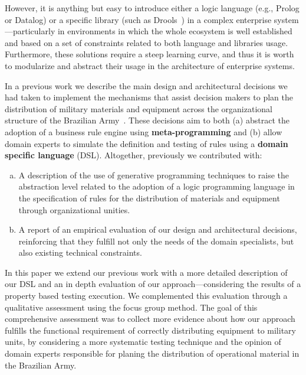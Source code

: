 \documentclass[AMA,STIX1COL,hidelinks]{WileyNJD-v2}
\begin{document}
However, it is anything but easy to introduce either a logic language (e.g., Prolog or Datalog) or a specific library (such as Drools~\cite{browne2009}) in a complex enterprise system---particularly in environments in which the whole ecosystem is well established and based on a set of constraints related to both language and libraries usage. Furthermore, these solutions require a steep learning curve, and thus it is worth to modularize and abstract their usage in the architecture of enterprise systems.

In a previous work we describe the main design and architectural decisions we had taken to implement the mechanisms that assist decision makers to plan the distribution of military materials and equipment across the organizational structure of the Brazilian Army~\cite{phtcosta:sbcars}. These decisions aim to both (a) abstract the adoption of a business rule engine using {\bf meta-programming} and (b) allow domain experts to simulate the definition and testing of rules using a {\bf domain specific language} (DSL). Altogether, previously we contributed with:

\begin{enumerate}[(a)] 

\item A description of the use of generative programming techniques to raise the abstraction level related to the adoption of a logic programming language in the specification of rules for the 	distribution of materials and equipment through organizational unities.

\item A report of an empirical evaluation of our design and architectural decisions, reinforcing that they fulfill not only the needs of the domain specialists, but also existing technical constraints. 	

\end{enumerate}


In this paper we extend our previous work with a more detailed description of our DSL and an in depth evaluation of our approach---considering the results of a property based testing execution. We complemented this evaluation through a qualitative assessment using the focus group method. The goal of this comprehensive assessment was to collect more evidence about how our approach fulfills the functional requirement of correctly distributing equipment to military units, by considering a more systematic testing technique and the opinion of domain experts responsible for planing the distribution of operational material in the Brazilian Army. 
\end{document}
